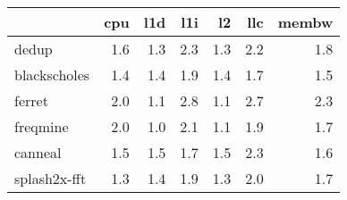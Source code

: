 \begin{tabular}{lrrrrrr}
\toprule
{} &  cpu &  l1d &  l1i &   l2 &  llc &  membw \\
\midrule
dedup        &  1.6 &  1.3 &  2.3 &  1.3 &  2.2 &    1.8 \\
blackscholes &  1.4 &  1.4 &  1.9 &  1.4 &  1.7 &    1.5 \\
ferret       &  2.0 &  1.1 &  2.8 &  1.1 &  2.7 &    2.3 \\
freqmine     &  2.0 &  1.0 &  2.1 &  1.1 &  1.9 &    1.7 \\
canneal      &  1.5 &  1.5 &  1.7 &  1.5 &  2.3 &    1.6 \\
splash2x-fft &  1.3 &  1.4 &  1.9 &  1.3 &  2.0 &    1.7 \\
\bottomrule
\end{tabular}
